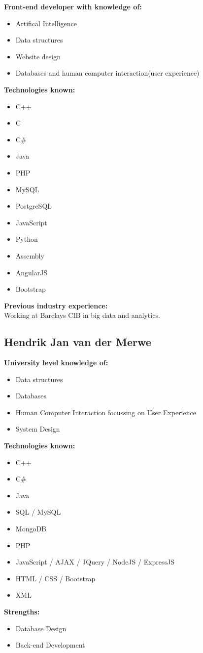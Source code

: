 \documentclass{article}
\begin{document}
\textbf{Front-end developer with knowledge of:}
\begin{itemize}
 	\item Artifical Intelligence
 	\item Data structures 
 	\item Website design 
 	\item Databases and human computer interaction(user experience)
 \end{itemize}
\textbf{Technologies known:}
\begin{itemize}
	\item C++ 
	\item C 
	\item C\# 
	\item Java 
	\item PHP
	\item MySQL
	\item PostgreSQL
	\item JavaScript 
	\item Python 
	\item Assembly 
	\item AngularJS  
	\item Bootstrap
 \end{itemize}
\textbf{Previous industry experience:}\\
Working at Barclays CIB in big data and analytics.
\\
\newpage
\subsection {Hendrik Jan van der Merwe} 
\textbf{University level knowledge of:}
\begin{itemize}
 	\item Data structures
 	\item Databases
 	\item Human Computer Interaction focussing on User Experience
 	\item System Design
\end{itemize}
\textbf{Technologies known:}
\begin{itemize}
	\item C++
	\item C\#
	\item Java
	\item SQL / MySQL
	\item MongoDB
	\item PHP
	\item JavaScript / AJAX / JQuery / NodeJS / ExpressJS
	\item HTML / CSS / Bootstrap
	\item XML
\end{itemize}
\textbf{Strengths:}
\begin{itemize}
	\item Database Design
	\item Back-end Development
\end{itemize}
\end{document}
